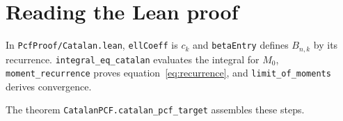 \documentclass[11pt]{article}
\begin{document}
\section*{Reading the Lean proof}

\begin{raggedright}
In \texttt{PcfProof/Catalan.lean}, \texttt{ellCoeff} is \(c_k\) and
\texttt{betaEntry} defines \(B_{n,k}\) by its recurrence.
\texttt{integral\_eq\_catalan} evaluates the integral for \(M_0\),
\texttt{moment\_recurrence} proves equation~\eqref{eq:recurrence}, and
\texttt{limit\_of\_moments} derives convergence.

The theorem
\texttt{CatalanPCF.catalan\_pcf\_target} assembles these steps.
\end{raggedright}
\end{document}

